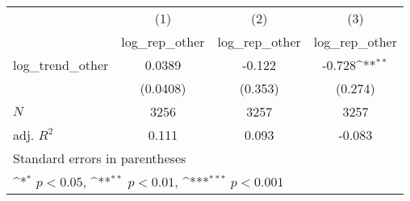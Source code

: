 {
\def\sym#1{\ifmmode^{#1}\else\(^{#1}\)\fi}
\begin{tabular}{l*{3}{c}}
\hline\hline
            &\multicolumn{1}{c}{(1)}&\multicolumn{1}{c}{(2)}&\multicolumn{1}{c}{(3)}\\
            &\multicolumn{1}{c}{log\_rep\_other}&\multicolumn{1}{c}{log\_rep\_other}&\multicolumn{1}{c}{log\_rep\_other}\\
\hline
log\_trend\_other&      0.0389         &      -0.122         &      -0.728\sym{**} \\
            &    (0.0408)         &     (0.353)         &     (0.274)         \\
\hline
\(N\)       &        3256         &        3257         &        3257         \\
adj. \(R^{2}\)&       0.111         &       0.093         &      -0.083         \\
\hline\hline
\multicolumn{4}{l}{\footnotesize Standard errors in parentheses}\\
\multicolumn{4}{l}{\footnotesize \sym{*} \(p<0.05\), \sym{**} \(p<0.01\), \sym{***} \(p<0.001\)}\\
\end{tabular}
}
